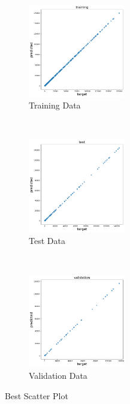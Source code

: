 \begin{figure}[tb]
     \centering
     \begin{subfigure}[t]{0.30\textwidth}
         \centering
         \includegraphics[height=1.6in]{Task 2 Images/best_scatterplot_batch_500_degree_6_lambda_0_training.png}
         \caption{Training Data}
     \end{subfigure}%
     ~ 
     \begin{subfigure}[t]{0.30\textwidth}
         \centering
         \includegraphics[height=1.6in]{Task 2 Images/best_scatterplot_batch_500_degree_6_lambda_0_test.png}
         \caption{Test Data }
     \end{subfigure}%
     ~
     \begin{subfigure}[t]{0.30\textwidth}
         \centering
         \includegraphics[height=1.6in]{Task 2 Images/best_scatterplot_batch_500_degree_6_lambda_0_validation.png}
         \caption{Validation Data }
     \end{subfigure}
     \caption{Best Scatter Plot}
     \label{fig:16}
\end{figure}
\newpage
